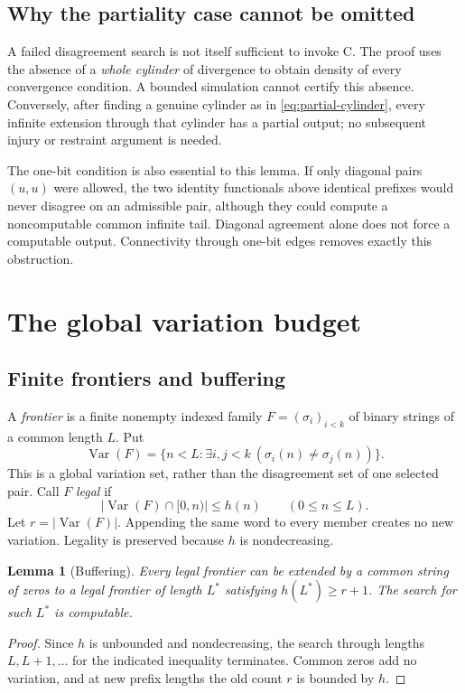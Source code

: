 \documentclass[11pt,a4paper]{article}
\newcommand{\Var}{\operatorname{Var}}
\newtheorem{lemma}[theorem]{Lemma}
\theoremstyle{definition}\newtheorem{definition}[theorem]{Definition}
\theoremstyle{remark}\newtheorem{remark}[theorem]{Remark}
\begin{document}
\subsection{Why the partiality case cannot be omitted}
A failed disagreement search is not itself sufficient to invoke C. The proof
uses the absence of a \emph{whole cylinder} of divergence to obtain density
of every convergence condition. A bounded simulation cannot certify this
absence. Conversely, after finding a genuine cylinder as in
\eqref{eq:partial-cylinder}, every infinite extension through that cylinder
has a partial output; no subsequent injury or restraint argument is needed.

The one-bit condition is also essential to this lemma. If only diagonal
pairs $(u,u)$ were allowed, the two identity functionals above identical
prefixes would never disagree on an admissible pair, although they could
compute a noncomputable common infinite tail. Diagonal agreement alone does
not force a computable output. Connectivity through one-bit edges removes
exactly this obstruction.

\section{The global variation budget}
\label{sec:budget}

\subsection{Finite frontiers and buffering}
A \emph{frontier} is a finite nonempty indexed family
$F=(\sigma_i)_{i<k}$ of binary strings of a common length $L$. Put
\[
 \Var(F)=\{n<L:\exists i,j<k\ (\sigma_i(n)\ne\sigma_j(n))\}.
\]
This is a global variation set, rather than the disagreement set of one
selected pair. Call $F$ \emph{legal} if
\begin{equation}\label{eq:frontier-legal}
          |\Var(F)\cap[0,n)|\le h(n)\qquad(0\le n\le L).
\end{equation}
Let $r=|\Var(F)|$. Appending the same word to every member creates no new
variation. Legality is preserved because $h$ is nondecreasing.

\begin{lemma}[Buffering]\label{lem:buffer}
Every legal frontier can be extended by a common string of zeros to a legal
frontier of length $L^*$ satisfying $h(L^*)\ge r+1$. The search for such
$L^*$ is computable.
\end{lemma}
\begin{proof}
Since $h$ is unbounded and nondecreasing, the search through lengths
$L,L+1,\ldots$ for the indicated inequality terminates. Common zeros add no
variation, and at new prefix lengths the old count $r$ is bounded by $h$.
\end{proof}
\end{document}
